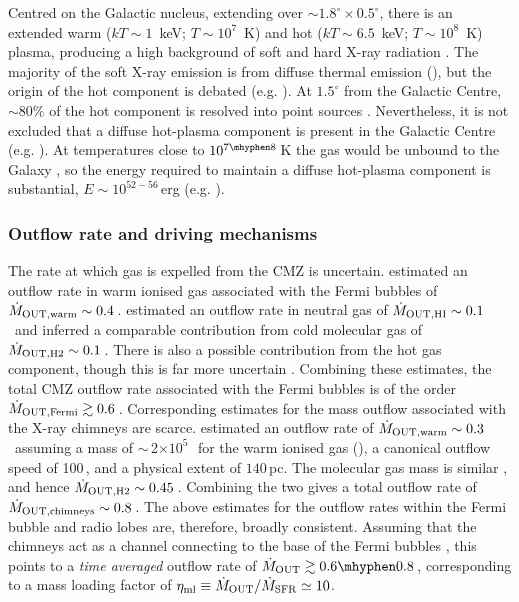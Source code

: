 Centred on the Galactic nucleus, extending over $\sim1.8^{\circ}\times0.5^{\circ}$, there is an extended warm ($kT\sim1$~keV; $T\sim10^7$~K) and hot ($kT\sim6.5$~keV; $T\sim10^{8}$~K) plasma, producing a high background of soft and hard X-ray radiation \citep[see e.g.][]{Ponti2015}. 
The majority of the soft X-ray emission is from diffuse thermal emission (\citealp{Ebisawa2001, Wang2002}), but the origin of the hot component is debated (e.g. \citealp{Crocker2012, Ponti2013}).
At $1.5^{\circ}$ from the Galactic Centre, $\sim80\%$ of the hot component is resolved into point sources \citep[e.g.\ accreting white dwarfs and coronally active stars;][]{Revnivtsev2009}.
Nevertheless, it is not excluded that a diffuse hot-plasma component is present in the Galactic Centre (e.g. \citealp{Koyama2009, Uchiyama2013}). 
At temperatures close to $10^{7\mhyphen8}$\,K the gas would be unbound to the Galaxy \citep[though magnetic fields may help to confine it;][]{Nishiyama2013}, so the energy required to maintain a diffuse hot-plasma component is substantial, $E\sim10^{52-56}$\,erg (e.g. \citealp{Morris1996, Crocker2012, Uchiyama2013}).

\subsubsection{Outflow rate and driving mechanisms}
\label{sec:feedback:outflowmechanisms}

The rate at which gas is expelled from the CMZ is uncertain. \citet{Bordoloi2017} estimated an outflow rate in warm ionised gas associated with the Fermi bubbles of $\dot{M}_{\rm OUT, warm} \sim 0.4$\,\msunyr. 
\citet{DiTeodoro2018} estimated an outflow rate in neutral gas of $\dot{M}_{\rm OUT, HI} \sim 0.1$\,\msunyr \ and
\citet{Diteodoro2020} inferred a comparable contribution from cold molecular gas of $\dot{M}_{\rm OUT, H2} \sim 0.1$\,\msunyr.
There is also a possible contribution from the hot gas component, though this is far more uncertain \citep[upper limit of $\dot{M}_\mathrm{hot} < 1$\,\msunyr, and possibly much lower;][]{Miller2016, Sormani2019b}. 
Combining these estimates, the total CMZ outflow rate associated with the Fermi bubbles is of the order $\dot{M}_{\rm OUT, Fermi} \gtrsim 0.6 $\,\msunyr. 
Corresponding estimates for the mass outflow associated with the X-ray chimneys are scarce. 
\citet{Crocker2012} estimated an outflow rate of $\dot{M}_{\rm OUT, warm} \sim 0.3$\,\msunyr \ assuming a mass of $\sim$\,2$\times10^{5}$\,\msun\ for the warm ionised gas (\citealp{Law2010}), a canonical outflow speed of 100\,\kms, and a physical extent of $140$\,pc. 
The molecular gas mass is similar \citep[$\sim$\,3$\times10^{5}$\,\msun;][]{Bland-Hawthorn2003}, and hence $\dot{M}_{\rm OUT, H2} \sim 0.45$\,\msunyr.
Combining the two gives a total outflow rate of $\dot{M}_{\rm OUT, chimneys} \sim 0.8 $\,\msunyr.  The above estimates for the outflow rates within the Fermi bubble and radio lobes are, therefore, broadly consistent. Assuming that the chimneys act as a channel connecting to the base of the Fermi bubbles \citep{Ponti2021}, this points to a \emph{time averaged} outflow rate of $\dot{M}_{\rm OUT} \gtrsim 0.6\mhyphen0.8 $\,\msunyr, corresponding to a mass loading factor of $\eta_\mathrm{ml}\equiv \dot{M}_{\rm OUT}/\dot{M}_{\rm SFR} \simeq10$.


